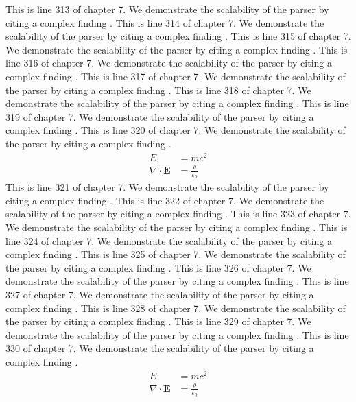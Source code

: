 This is line 313 of chapter 7. We demonstrate the scalability of the parser by citing a complex finding \cite{ref7_313}.
This is line 314 of chapter 7. We demonstrate the scalability of the parser by citing a complex finding \cite{ref7_314}.
This is line 315 of chapter 7. We demonstrate the scalability of the parser by citing a complex finding \cite{ref7_315}.
This is line 316 of chapter 7. We demonstrate the scalability of the parser by citing a complex finding \cite{ref7_316}.
This is line 317 of chapter 7. We demonstrate the scalability of the parser by citing a complex finding \cite{ref7_317}.
This is line 318 of chapter 7. We demonstrate the scalability of the parser by citing a complex finding \cite{ref7_318}.
This is line 319 of chapter 7. We demonstrate the scalability of the parser by citing a complex finding \cite{ref7_319}.
This is line 320 of chapter 7. We demonstrate the scalability of the parser by citing a complex finding \cite{ref7_320}.
\begin{align*}
  E &= mc^2 \\
  \nabla \cdot \mathbf{E} &= \frac{\rho}{\varepsilon_0}
\end{align*}
This is line 321 of chapter 7. We demonstrate the scalability of the parser by citing a complex finding \cite{ref7_321}.
This is line 322 of chapter 7. We demonstrate the scalability of the parser by citing a complex finding \cite{ref7_322}.
This is line 323 of chapter 7. We demonstrate the scalability of the parser by citing a complex finding \cite{ref7_323}.
This is line 324 of chapter 7. We demonstrate the scalability of the parser by citing a complex finding \cite{ref7_324}.
This is line 325 of chapter 7. We demonstrate the scalability of the parser by citing a complex finding \cite{ref7_325}.
This is line 326 of chapter 7. We demonstrate the scalability of the parser by citing a complex finding \cite{ref7_326}.
This is line 327 of chapter 7. We demonstrate the scalability of the parser by citing a complex finding \cite{ref7_327}.
This is line 328 of chapter 7. We demonstrate the scalability of the parser by citing a complex finding \cite{ref7_328}.
This is line 329 of chapter 7. We demonstrate the scalability of the parser by citing a complex finding \cite{ref7_329}.
This is line 330 of chapter 7. We demonstrate the scalability of the parser by citing a complex finding \cite{ref7_330}.
\begin{align*}
  E &= mc^2 \\
  \nabla \cdot \mathbf{E} &= \frac{\rho}{\varepsilon_0}
\end{align*}
